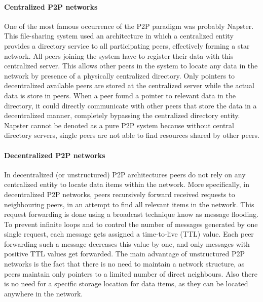 \paragraph{Centralized P2P networks} One of the most famous occurrence of the P2P paradigm was probably Napster. This file-sharing system used an architecture in which a centralized entity provides a directory service to all participating peers, effectively forming a star network. All peers joining the system have to register their data with this centralized server. This allows other peers in the system to locate any data in the network by presence of a physically centralized directory. Only pointers to decentralized available peers are stored at the centralized server while the actual data is store in peers. When a peer found a pointer to relevant data in the directory, it could directly communicate with other peers that store the data in a decentralized manner, completely bypassing the centralized directory entity. Napster cannot be denoted as a pure P2P system because without central directory servers, single peers are not able to find resources shared by other peers.
\\

\paragraph{Decentralized P2P networks}
In decentralized (or unstructured) P2P architectures peers do not rely on any centralized entity to locate data items within the network. More specifically, in decentralized P2P networks, peers recursively forward received requests to neighbouring peers, in an attempt to find all relevant items in the network. This request forwarding is done using a broadcast technique know as message flooding. To prevent infinite loops and to control the number of messages generated by one single request, each message gets assigned a time-to-live (TTL) value. Each peer forwarding such a message decreases this value by one, and only messages with positive TTL values get forwarded. The main advantage of unstructured P2P networks is the fact that there is no need to maintain a network structure, as peers maintain only pointers to a limited number of direct neighbours. Also there is no need for a specific storage location for data items, as they can be located anywhere in the network.
\\

